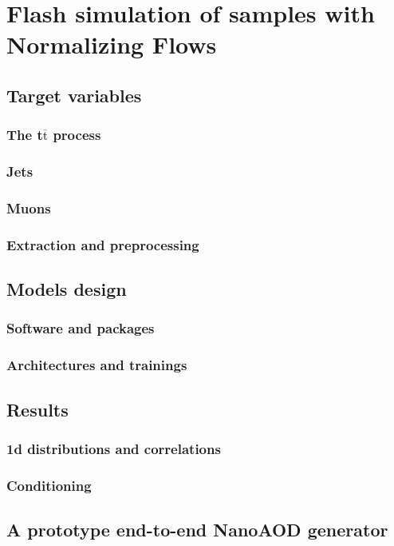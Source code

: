 \chapter{Flash simulation of samples with Normalizing Flows}\label{ch:fs} %

\section{Target variables}

\subsection{The t$\overline{\text{t}}$ process}

\subsection{Jets}

\subsection{Muons}

\subsection{Extraction and preprocessing}

\section{Models design}

\subsection{Software and packages}

\subsection{Architectures and trainings}

\section{Results}

\subsection{1d distributions and correlations}

\subsection{Conditioning}

\section{A prototype end-to-end NanoAOD generator}
